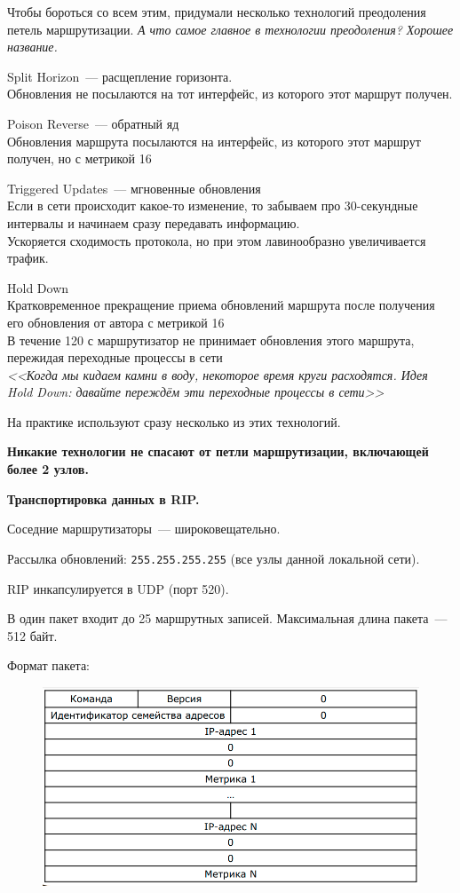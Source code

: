 Чтобы бороться со всем этим, придумали несколько технологий преодоления петель маршрутизации. {\it А что самое главное в технологии преодоления? Хорошее название.}
\begin{MyItemize}
    \item Split Horizon~--- расщепление горизонта.\\
    Обновления не посылаются на тот интерфейс, из которого этот маршрут получен. 
    \item Poison Reverse~--- обратный яд\\
    Обновления маршрута посылаются на интерфейс, из которого этот маршрут получен, но с метрикой 16
    \item Triggered Updates~--- мгновенные обновления\\
    Если в сети происходит какое-то изменение, то забываем про 30-секундные интервалы и начинаем сразу передавать информацию.\\
    Ускоряется сходимость протокола, но при этом лавинообразно увеличивается трафик.
    \item Hold Down\\
    Кратковременное прекращение приема обновлений маршрута после получения его обновления от автора с метрикой 16\\
    В течение 120 с маршрутизатор не принимает обновления этого маршрута, пережидая переходные процессы в сети\\
    {\it <<Когда мы кидаем камни в воду, некоторое время круги расходятся. Идея Hold Down: давайте переждём эти переходные процессы в сети>>}
\end{MyItemize}

На практике используют сразу несколько из этих технологий. 

{\bf Никакие технологии не спасают от петли маршрутизации, включающей более 2 узлов.}

{\bf Транспортировка данных в RIP.}

Соседние маршрутизаторы~--- широковещательно.

Рассылка обновлений: {\tt 255.255.255.255} (все узлы данной локальной сети).

RIP инкапсулируется в UDP (порт 520).

В один пакет входит до 25 маршрутных записей. Максимальная длина пакета~--- 512 байт.

Формат пакета:

\begin{figure}[H]
  \centering
  \includegraphics[width=15cm]{images/04/07}
\end{figure}

